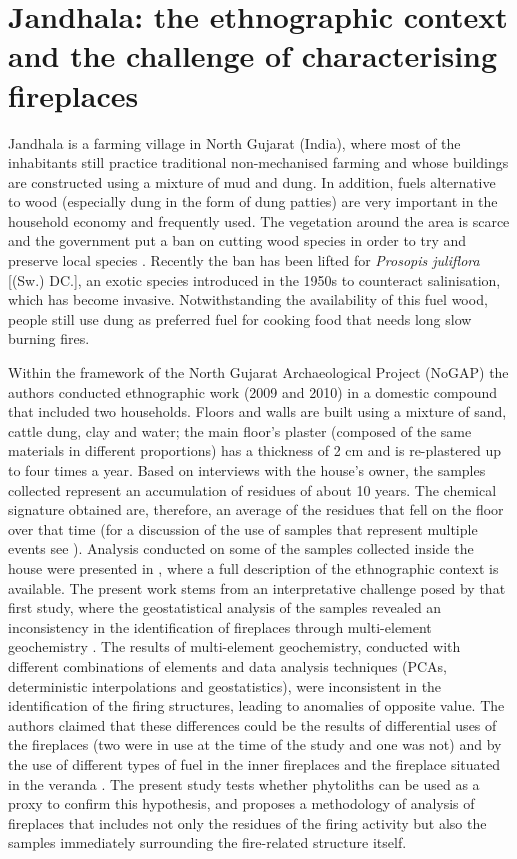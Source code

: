 \documentclass[authoryear,preprint,review,12pt]{elsarticle}
\begin{document}
\section{Jandhala: the ethnographic context and the challenge of characterising fireplaces}
\label{subsec:1.2}
Jandhala is a farming village in North Gujarat (India), where most of the inhabitants still practice traditional non-mechanised farming and whose buildings are constructed using a mixture of mud and dung. In addition, fuels alternative to wood (especially dung in the form of dung patties) are very important in the household economy and frequently used. The vegetation around the area is scarce and the government put a ban on cutting wood species in order to try and preserve local species \citep{Lancelotti2010}. Recently the ban has been lifted for \textit{Prosopis juliflora} [(Sw.) DC.], an exotic species introduced in the 1950s to counteract salinisation, which has become invasive. Notwithstanding the availability of this fuel wood, people still use dung as preferred fuel for cooking food that needs long slow burning fires.\par
Within the framework of the North Gujarat Archaeological Project (NoGAP) \citep{antiquitygallery} the authors conducted ethnographic work (2009 and 2010) in a domestic compound that included two households. Floors and walls are built using a mixture of sand, cattle dung, clay and water; the main floor's plaster (composed of the same materials in different proportions) has a thickness of  2 cm and is re-plastered up to four times a year. Based on interviews with the house's owner, the samples collected represent an accumulation of residues of about 10 years. The chemical signature obtained are, therefore, an average of the residues that fell on the floor over that time (for a discussion of the use of samples that represent multiple events see \citealt{Barba1986,Middleton2010}). Analysis conducted on some of the samples collected inside the house were presented in \citet{Rondelli2014}, where a full description of the ethnographic context is available. The present work stems from an interpretative challenge posed by that first study, where the geostatistical analysis of the samples revealed an inconsistency in the identification of fireplaces through multi-element geochemistry \citep[figures 9 and 10]{Rondelli2014}. The results of multi-element geochemistry, conducted with different combinations of elements and data analysis techniques (PCAs, deterministic interpolations and geostatistics), were inconsistent in the identification of the firing structures, leading to anomalies of opposite value. The authors claimed that these differences could be the results of differential uses of the fireplaces (two were in use at the time of the study and one was not) and by the use of different types of fuel in the inner fireplaces and the fireplace situated in the veranda \citep[figure 3][and figure \ref{fig:samples} in this manuscript]{Rondelli2014}. The present study tests whether phytoliths can be used as a proxy to confirm this hypothesis, and proposes a methodology of analysis of fireplaces that includes not only the residues of the firing activity but also the samples immediately surrounding the fire-related structure itself.
\end{document}
